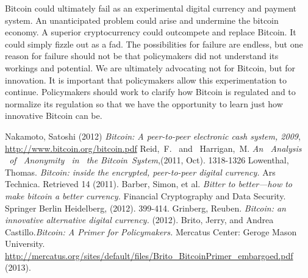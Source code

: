 Bitcoin could ultimately fail as an experimental digital currency
and payment system. An unanticipated problem could arise and
undermine the bitcoin economy. A superior cryptocurrency could
outcompete and replace Bitcoin. It could simply fizzle out as a fad.
The possibilities for failure are endless, but one reason for failure
should not be that policymakers did not understand its workings
and potential. We are ultimately advocating not for Bitcoin, but
for innovation. It is important that policymakers allow this experimentation
to continue. Policymakers should work to clarify how
Bitcoin is regulated and to normalize its regulation so that we have
the opportunity to learn just how innovative Bitcoin can be.
%
%
%
%
\clearpage
{}
%
%
\begin{thebibliography}{99}
Nakamoto, Satoshi (2012) {\em Bitcoin: A peer-to-peer electronic cash system, 2009}, \url{http://www.bitcoin.org/bitcoin.pdf}
Reid, F.  and  Harrigan, M. {\em  An  Analysis  of  Anonymity  in  the  Bitcoin System},(2011, Oct). 1318-1326
Lowenthal, Thomas. {\em Bitcoin: inside the encrypted, peer-to-peer digital currency.} Ars Technica. Retrieved 14 (2011).
Barber, Simon, et al. {\em Bitter to better—how to make bitcoin a better currency.} Financial Cryptography and Data Security. Springer Berlin Heidelberg, (2012). 399-414.
Grinberg, Reuben. {\em Bitcoin: an innovative alternative digital currency.} (2012).
Brito, Jerry, and Andrea Castillo.{\em Bitcoin: A Primer for Policymakers.} Mercatus Center: Geroge Mason University. \url{http://mercatus.org/sites/default/files/Brito_BitcoinPrimer_embargoed.pdf} (2013).
\end{thebibliography}
%
%

%
%

